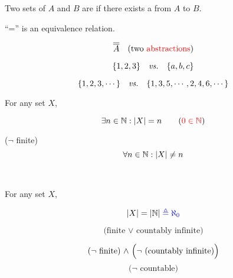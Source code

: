 \begin{frame}{}
\end{frame}

\begin{frame}{}
  \begin{definition}[$|A| = |B| \;(A \approx B)$ (1878)]
    Two sets of $A$ and $B$ are  if there exists a  from $A$ to $B$.
  \end{definition}

  \pause
  \vspace{0.60cm}
  \centerline{``='' is an equivalence relation.}

  \pause
  \[
    \overline{\overline{A}} \quad \text{(two \textcolor{red}{abstractions})}
  \]

  \pause
  \[
    \{1,2,3\} \quad \text{\it vs.} \quad \{a,b,c\}
  \]

  \pause
  \[
    \{1,2,3,\cdots\} \quad \text{\it vs.} \quad \{1,3,5,\cdots, 2,4,6,\cdots\}
  \]
\end{frame}

\begin{frame}{}
  \begin{definition}
    For any set $X$,
    \begin{description}[Infinite]
      \item[Finite] 
	\[
	  \exists n \in \mathbb{N}: |X| = n  \qquad (\textcolor{red}{0 \in \mathbb{N}})
	\]
      \item[Infinite] ($\lnot$ finite)
	\[
	  \forall n \in \mathbb{N}: |X| \neq n
	\]
    \end{description}
  \end{definition}

  \pause
  \vspace{0.30cm}
  \begin{center}
    {} \\[8pt]
    \pause
    {}
  \end{center}
\end{frame}

\begin{frame}{}
  \begin{definition}
    For any set $X$,
    \begin{description}
      \item[Countably Infinite]
	\[
	  |X| = |\mathbb{N}| \textcolor{blue}{\;\triangleq \aleph_{0}}
	\]
      \item[Countable]
	\[
	  \text{(finite $\lor$ countably infinite)}
	\]
      \item[Uncountably Infinite] 
	\[
	  \text{($\lnot$ finite) $\land$ \Big($\lnot$ (countably infinite)\Big)}
	\]
	\[
	  \text{($\lnot$ countable)}
	\]
    \end{description}
  \end{definition}
\end{frame}

